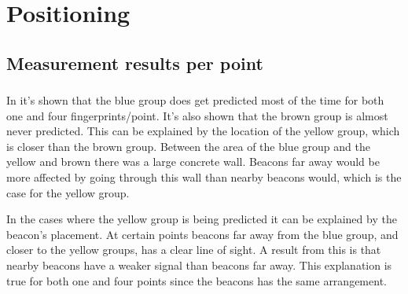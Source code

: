 \section{Positioning}\label{sec:resultPos}



\subsection{Measurement results per point}\label{sec:resultsPosOneFingerprint}


\subsubsection{}\label{sec:resultsPerPointBlue}
In  it's shown that the blue group does get predicted most of the time for both one and four fingerprints/point.
It's also shown that the brown group is almost never predicted.
This can be explained by the location of the yellow group, which is closer than the brown group.
Between the area of the blue group and the yellow and brown there was a large concrete wall.
Beacons far away would be more affected by going through this wall than nearby beacons would, which is the case for the yellow group.


In the cases where the yellow group is being predicted it can be explained by the beacon's placement.
At certain points beacons far away from the blue group, and closer to the yellow groups, has a clear line of sight.
A result from this is that nearby beacons have a weaker signal than beacons far away.
This explanation is true for both one and four points since the beacons has the same arrangement.

